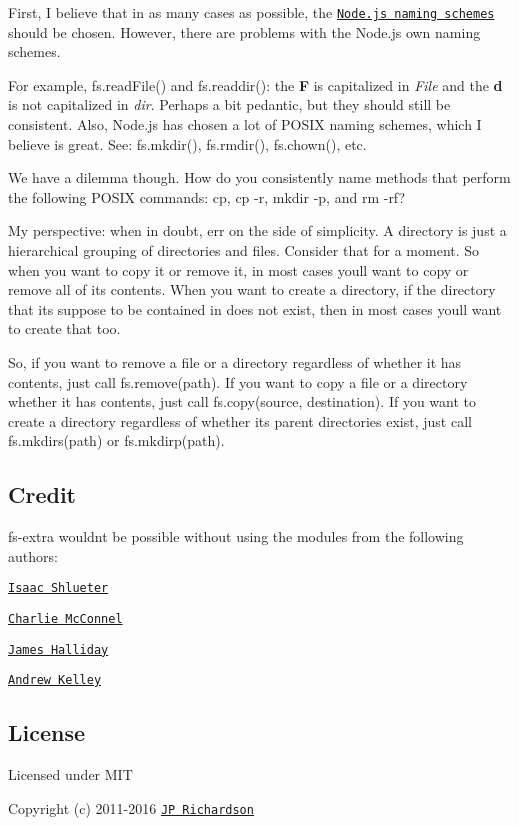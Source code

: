 First, I believe that in as many cases as possible, the \href{http://nodejs.org/api/fs.html}{\tt Node.\+js naming schemes} should be chosen. However, there are problems with the Node.\+js own naming schemes.

For example, {\ttfamily fs.\+read\+File()} and {\ttfamily fs.\+readdir()}\+: the {\bfseries F} is capitalized in {\itshape File} and the {\bfseries d} is not capitalized in {\itshape dir}. Perhaps a bit pedantic, but they should still be consistent. Also, Node.\+js has chosen a lot of P\+O\+S\+IX naming schemes, which I believe is great. See\+: {\ttfamily fs.\+mkdir()}, {\ttfamily fs.\+rmdir()}, {\ttfamily fs.\+chown()}, etc.

We have a dilemma though. How do you consistently name methods that perform the following P\+O\+S\+IX commands\+: {\ttfamily cp}, {\ttfamily cp -\/r}, {\ttfamily mkdir -\/p}, and {\ttfamily rm -\/rf}?

My perspective\+: when in doubt, err on the side of simplicity. A directory is just a hierarchical grouping of directories and files. Consider that for a moment. So when you want to copy it or remove it, in most cases you\textquotesingle{}ll want to copy or remove all of its contents. When you want to create a directory, if the directory that it\textquotesingle{}s suppose to be contained in does not exist, then in most cases you\textquotesingle{}ll want to create that too.

So, if you want to remove a file or a directory regardless of whether it has contents, just call {\ttfamily fs.\+remove(path)}. If you want to copy a file or a directory whether it has contents, just call {\ttfamily fs.\+copy(source, destination)}. If you want to create a directory regardless of whether its parent directories exist, just call {\ttfamily fs.\+mkdirs(path)} or {\ttfamily fs.\+mkdirp(path)}.

\subsection*{Credit }

{\ttfamily fs-\/extra} wouldn\textquotesingle{}t be possible without using the modules from the following authors\+:


\begin{DoxyItemize}
\item \href{https://github.com/isaacs}{\tt Isaac Shlueter}
\item \href{https://github.com/avianflu}{\tt Charlie Mc\+Connel}
\item \href{https://github.com/substack}{\tt James Halliday}
\item \href{https://github.com/andrewrk}{\tt Andrew Kelley}
\end{DoxyItemize}

\subsection*{License }

Licensed under M\+IT

Copyright (c) 2011-\/2016 \href{https://github.com/jprichardson}{\tt JP Richardson} 